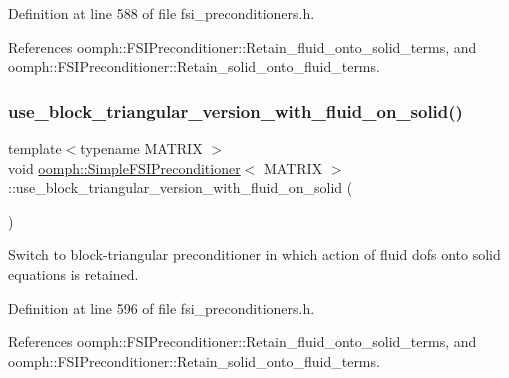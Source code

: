 Definition at line 588 of file fsi\+\_\+preconditioners.\+h.



References oomph\+::\+F\+S\+I\+Preconditioner\+::\+Retain\+\_\+fluid\+\_\+onto\+\_\+solid\+\_\+terms, and oomph\+::\+F\+S\+I\+Preconditioner\+::\+Retain\+\_\+solid\+\_\+onto\+\_\+fluid\+\_\+terms.

\mbox{\label{classoomph_1_1SimpleFSIPreconditioner_ae996d56f6e94d88967e8aad4e664ee74}} 
\subsubsection{\texorpdfstring{use\+\_\+block\+\_\+triangular\+\_\+version\+\_\+with\+\_\+fluid\+\_\+on\+\_\+solid()}{use\_block\_triangular\_version\_with\_fluid\_on\_solid()}}
{\footnotesize\ttfamily template$<$typename M\+A\+T\+R\+IX $>$ \\
void \hyperlink{classoomph_1_1SimpleFSIPreconditioner}{oomph\+::\+Simple\+F\+S\+I\+Preconditioner}$<$ M\+A\+T\+R\+IX $>$\+::use\+\_\+block\+\_\+triangular\+\_\+version\+\_\+with\+\_\+fluid\+\_\+on\+\_\+solid (\begin{DoxyParamCaption}{ }\end{DoxyParamCaption})\hspace{0.3cm}{\ttfamily [inline]}}



Switch to block-\/triangular preconditioner in which action of fluid dofs onto solid equations is retained. 



Definition at line 596 of file fsi\+\_\+preconditioners.\+h.



References oomph\+::\+F\+S\+I\+Preconditioner\+::\+Retain\+\_\+fluid\+\_\+onto\+\_\+solid\+\_\+terms, and oomph\+::\+F\+S\+I\+Preconditioner\+::\+Retain\+\_\+solid\+\_\+onto\+\_\+fluid\+\_\+terms.

